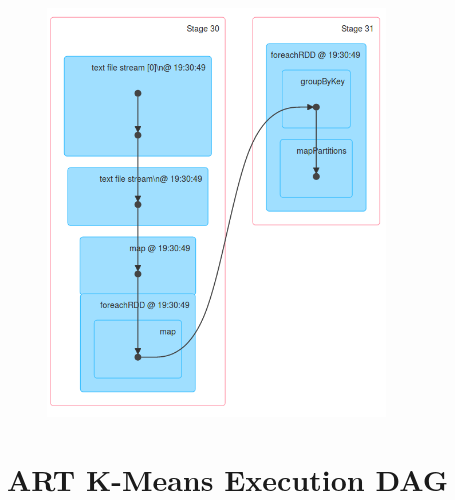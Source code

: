 \documentclass{l4proj}
\begin{document}
\begin{appendices}
\begin{figure}[H]
	\centering
    \label{fig:dag6}
    \includegraphics[width=0.80\textwidth]{images/DAG6}
\end{figure}

\section{ART K-Means Execution DAG}


\end{appendices}
\end{document}
